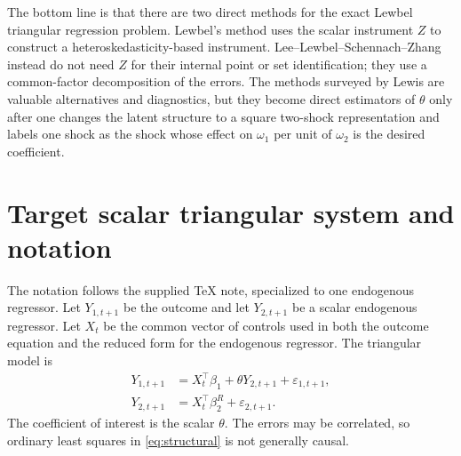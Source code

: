 \documentclass[11pt]{article}
\newcommand{\T}{\top}
\theoremstyle{plain}
\theoremstyle{definition}
\theoremstyle{remark}
\begin{document}
The bottom line is that there are two direct methods for the exact Lewbel
triangular regression problem. Lewbel's method uses the scalar instrument $Z$ to
construct a heteroskedasticity-based instrument. Lee--Lewbel--Schennach--Zhang
instead do not need $Z$ for their internal point or set identification; they use a
common-factor decomposition of the errors. The methods surveyed by Lewis are
valuable alternatives and diagnostics, but they become direct estimators of
$\theta$ only after one changes the latent structure to a square two-shock
representation and labels one shock as the shock whose effect on $\omega_1$ per unit
of $\omega_2$ is the desired coefficient.

\section{Target scalar triangular system and notation}
\label{sec:model}

The notation follows the supplied TeX note, specialized to one endogenous
regressor. Let $Y_{1,t+1}$ be the outcome and let $Y_{2,t+1}$ be a scalar
endogenous regressor. Let $X_t$ be the common vector of controls used in both the
outcome equation and the reduced form for the endogenous regressor. The
triangular model is
\begin{align}
Y_{1,t+1} &= X_t^\T\beta_1 + \theta Y_{2,t+1}+\varepsilon_{1,t+1},
\label{eq:structural}\\
Y_{2,t+1} &= X_t^\T\beta_2^R+\varepsilon_{2,t+1}.
\label{eq:firststage}
\end{align}
The coefficient of interest is the scalar $\theta$. The errors may be correlated,
so ordinary least squares in \eqref{eq:structural} is not generally causal.
\end{document}
